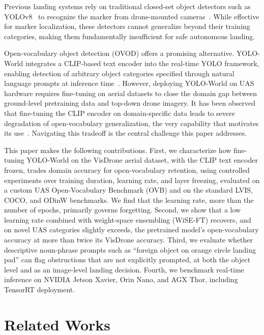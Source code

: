 \documentclass[conf]{new-aiaa}
\begin{document}
Previous landing systems rely on traditional closed-set object detectors such as YOLOv8~\cite{ultralytics2023} to recognize the marker from drone-mounted cameras~\cite{fattahi2017automatic, xu2024small}. While effective for marker localization, these detectors cannot generalize beyond their training categories, making them fundamentally insufficient for safe autonomous landing.

Open-vocabulary object detection (OVOD) offers a promising alternative. YOLO-World integrates a CLIP-based text encoder into the real-time YOLO framework, enabling detection of arbitrary object categories specified through natural language prompts at inference time~\cite{cheng2024yoloworld, radford2021learning}. However, deploying YOLO-World on UAS hardware requires fine-tuning on aerial datasets to close the domain gap between ground-level pretraining data and top-down drone imagery. It has been observed that fine-tuning the CLIP encoder on domain-specific data leads to severe degradation of open-vocabulary generalization, the very capability that motivates its use~\cite{cheng2024yoloworld}. Navigating this tradeoff is the central challenge this paper addresses.

This paper makes the following contributions. First, we characterize how fine-tuning
YOLO-World on the VisDrone aerial dataset, with the CLIP text encoder frozen, trades domain
accuracy for open-vocabulary retention, using controlled experiments over training duration,
learning rate, and layer freezing, evaluated on a custom UAS Open-Vocabulary Benchmark (OVB)
and on the standard LVIS, COCO, and ODinW benchmarks. We find that the learning rate, more
than the number of epochs, primarily governs forgetting. Second, we show that a low learning
rate combined with weight-space ensembling (WiSE-FT) recovers, and on novel UAS categories
slightly exceeds, the pretrained model's open-vocabulary accuracy at more than twice its
VisDrone accuracy. Third, we evaluate whether descriptive noun-phrase prompts such as
``foreign object on orange circle landing pad'' can flag obstructions that are not explicitly
prompted, at both the object level and as an image-level landing decision. Fourth, we
benchmark real-time inference on NVIDIA Jetson Xavier, Orin Nano, and AGX Thor, including
TensorRT deployment.


\section{Related Works}
\end{document}
